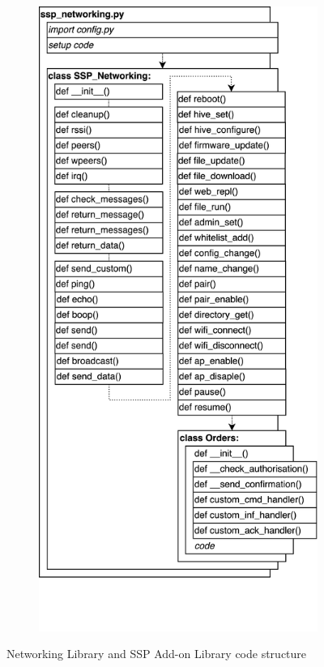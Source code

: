 \begin{figure}[H]
\begin{subfigure}[b]{0.45\textwidth}
    \end{subfigure}%
    \hspace{0.05\textwidth}
    \begin{subfigure}[b]{0.45\textwidth}%
        \includegraphics[width=\textwidth]{overleaf/images/ssp_networking_structure.drawio.png}%
    \end{subfigure}%
    \vspace{\ftspace}
    \caption{Networking Library and SSP Add-on Library code structure}
    \label{fig:net_net_structure}
\end{figure}

